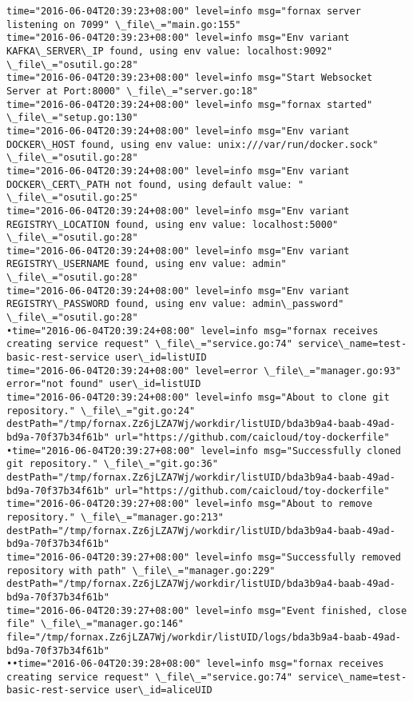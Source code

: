 \begin{lstlisting}[caption={Fornax功能性测试日志}]
time="2016-06-04T20:39:23+08:00" level=info msg="fornax server listening on 7099" \_file\_="main.go:155" 
time="2016-06-04T20:39:23+08:00" level=info msg="Env variant KAFKA\_SERVER\_IP found, using env value: localhost:9092" \_file\_="osutil.go:28" 
time="2016-06-04T20:39:23+08:00" level=info msg="Start Websocket Server at Port:8000" \_file\_="server.go:18" 
time="2016-06-04T20:39:24+08:00" level=info msg="fornax started" \_file\_="setup.go:130" 
time="2016-06-04T20:39:24+08:00" level=info msg="Env variant DOCKER\_HOST found, using env value: unix:///var/run/docker.sock" \_file\_="osutil.go:28" 
time="2016-06-04T20:39:24+08:00" level=info msg="Env variant DOCKER\_CERT\_PATH not found, using default value: " \_file\_="osutil.go:25" 
time="2016-06-04T20:39:24+08:00" level=info msg="Env variant REGISTRY\_LOCATION found, using env value: localhost:5000" \_file\_="osutil.go:28" 
time="2016-06-04T20:39:24+08:00" level=info msg="Env variant REGISTRY\_USERNAME found, using env value: admin" \_file\_="osutil.go:28" 
time="2016-06-04T20:39:24+08:00" level=info msg="Env variant REGISTRY\_PASSWORD found, using env value: admin\_password" \_file\_="osutil.go:28" 
•time="2016-06-04T20:39:24+08:00" level=info msg="fornax receives creating service request" \_file\_="service.go:74" service\_name=test-basic-rest-service user\_id=listUID 
time="2016-06-04T20:39:24+08:00" level=error \_file\_="manager.go:93" error="not found" user\_id=listUID 
time="2016-06-04T20:39:24+08:00" level=info msg="About to clone git repository." \_file\_="git.go:24" destPath="/tmp/fornax.Zz6jLZA7Wj/workdir/listUID/bda3b9a4-baab-49ad-bd9a-70f37b34f61b" url="https://github.com/caicloud/toy-dockerfile" 
•time="2016-06-04T20:39:27+08:00" level=info msg="Successfully cloned git repository." \_file\_="git.go:36" destPath="/tmp/fornax.Zz6jLZA7Wj/workdir/listUID/bda3b9a4-baab-49ad-bd9a-70f37b34f61b" url="https://github.com/caicloud/toy-dockerfile" 
time="2016-06-04T20:39:27+08:00" level=info msg="About to remove repository." \_file\_="manager.go:213" destPath="/tmp/fornax.Zz6jLZA7Wj/workdir/listUID/bda3b9a4-baab-49ad-bd9a-70f37b34f61b" 
time="2016-06-04T20:39:27+08:00" level=info msg="Successfully removed repository with path" \_file\_="manager.go:229" destPath="/tmp/fornax.Zz6jLZA7Wj/workdir/listUID/bda3b9a4-baab-49ad-bd9a-70f37b34f61b" 
time="2016-06-04T20:39:27+08:00" level=info msg="Event finished, close file" \_file\_="manager.go:146" file="/tmp/fornax.Zz6jLZA7Wj/workdir/listUID/logs/bda3b9a4-baab-49ad-bd9a-70f37b34f61b" 
••time="2016-06-04T20:39:28+08:00" level=info msg="fornax receives creating service request" \_file\_="service.go:74" service\_name=test-basic-rest-service user\_id=aliceUID 

\end{lstlisting}

